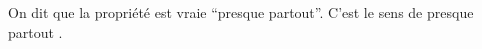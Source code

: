 On dit que la propriété est vraie ``presque partout''. %
C'est le sens de \og presque partout \fg. %
